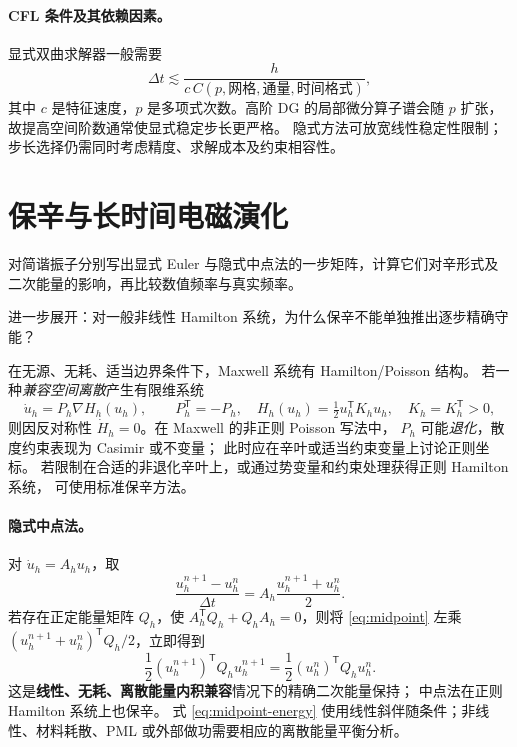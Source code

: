 \documentclass[UTF8,11pt,openany]{ctexbook}
\numberwithin{equation}{chapter}
\theoremstyle{definition}
\theoremstyle{remark}
\begin{document}
\paragraph{CFL 条件及其依赖因素。}
显式双曲求解器一般需要
\begin{equation}\label{eq:cflgeneral}
\Delta t\lesssim \frac{h}{c\,C(p,\text{网格},\text{通量},\text{时间格式})},
\end{equation}
其中 $c$ 是特征速度，$p$ 是多项式次数。高阶 DG 的局部微分算子谱会随 $p$
扩张，故提高空间阶数通常使显式稳定步长更严格。
隐式方法可放宽线性稳定性限制；步长选择仍需同时考虑精度、求解成本及约束相容性。

\section{保辛与长时间电磁演化}\label{sec:bridge-symp}
\begin{askai}
对简谐振子分别写出显式 Euler 与隐式中点法的一步矩阵，计算它们对辛形式及二次能量的影响，再比较数值频率与真实频率。

进一步展开：对一般非线性 Hamilton 系统，为什么保辛不能单独推出逐步精确守能？
\end{askai}
在无源、无耗、适当边界条件下，Maxwell 系统有 Hamilton/Poisson 结构。
若一种\emph{兼容空间离散}产生有限维系统
\begin{equation}\label{eq:discrete-hamiltonian}
\dot u_h=P_h\nabla H_h(u_h),\qquad
P_h^\mathsf T=-P_h,\quad
H_h(u_h)=\tfrac12u_h^\mathsf TK_hu_h,
\quad K_h=K_h^\mathsf T>0,
\end{equation}
则因反对称性 $\dot H_h=0$。在 Maxwell 的非正则 Poisson 写法中，
$P_h$ 可能\emph{退化}，散度约束表现为 Casimir 或不变量；
此时应在辛叶或适当约束变量上讨论正则坐标。
若限制在合适的非退化辛叶上，或通过势变量和约束处理获得正则 Hamilton 系统，
可使用标准保辛方法。

\paragraph{隐式中点法。}
对 $\dot u_h=A_hu_h$，取
\begin{equation}\label{eq:midpoint}
\frac{u_h^{n+1}-u_h^n}{\Delta t}
=A_h\frac{u_h^{n+1}+u_h^n}{2}.
\end{equation}
若存在正定能量矩阵 $Q_h$，使
$A_h^\mathsf TQ_h+Q_hA_h=0$，则将
\eqref{eq:midpoint} 左乘
$(u_h^{n+1}+u_h^n)^\mathsf TQ_h/2$，立即得到
\begin{equation}\label{eq:midpoint-energy}
\frac12(u_h^{n+1})^\mathsf TQ_hu_h^{n+1}
=\frac12(u_h^n)^\mathsf TQ_hu_h^n.
\end{equation}
这是\textbf{线性、无耗、离散能量内积兼容}情况下的精确二次能量保持；
中点法在正则 Hamilton 系统上也保辛。
式 \eqref{eq:midpoint-energy} 使用线性斜伴随条件；非线性、材料耗散、PML 或外部做功需要相应的离散能量平衡分析。
\end{document}
